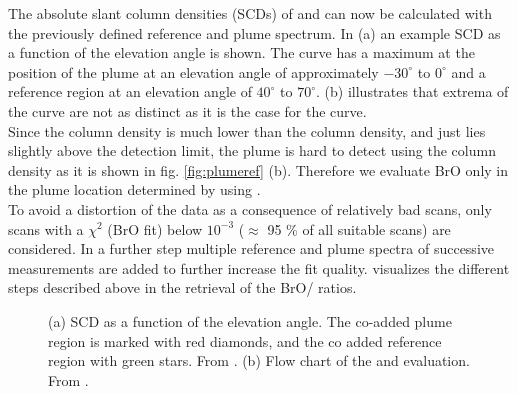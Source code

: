 The absolute slant column densities (SCDs) of   and  can now be calculated with the previously defined reference and plume spectrum.
In  (a) an example  SCD as a function of the elevation angle is shown. The  curve has a maximum at the position of the plume at an elevation angle of approximately $-30^{\circ}$ to $0^{\circ}$  and a reference region at an elevation angle of $40^{\circ}$ to $70^{\circ}$.  (b)  illustrates that  extrema of the   curve are not as distinct as it is the case for the  curve.\\
Since the  column density is much lower than the  column density, and just lies slightly above the detection limit, the plume is hard to detect using the  column density as it is shown in fig. \ref{fig:plumeref} (b). 
Therefore we evaluate BrO only in the plume location determined by using .\\
To avoid a distortion of the data as a consequence of relatively bad scans, only scans with a $\chi^2$ (BrO fit) below $10^{-3}$ ($\approx$	95 \% of all suitable scans) are considered.
In a further step multiple reference and plume spectra of successive measurements are added to further increase the fit quality.
 visualizes the different steps described above in the retrieval of the BrO/ ratios.\\
\begin{figure}
	\caption{(a)  SCD as a function of the elevation angle. The co-added plume region is marked with red diamonds, and the co added reference region with green stars. From \cite{WarnachSimon}. (b) Flow chart of the   and  evaluation. From \cite{lubcke2014optical}.}
	\label{fig:algorithm}
\end{figure}
